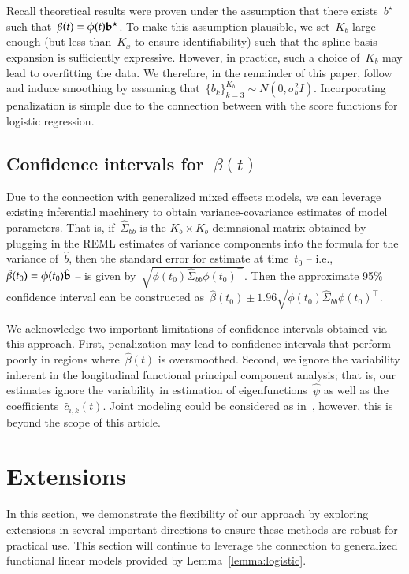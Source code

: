 \documentclass[12pt]{amsart}
\begin{document}
Recall theoretical results were proven under the assumption that there
exists~$b^\star$ such that~$\beta(t) = \phi(t) {\bf b}^\star$.
To make this assumption plausible, we set~$K_b$ large enough (but less
than~$K_x$ to ensure identifiability) such that the spline basis
expansion is sufficiently expressive. However, in practice, such a
choice of~$K_b$ may lead to overfitting the data. We therefore, in the
remainder of this paper, follow~\cite{GoldSmith2015} and induce
smoothing by assuming that~$\{ b_k \}_{k=3}^{K_b} \sim N(0, \sigma_b^2
I)$. Incorporating penalization is simple due to the connection
between with the score functions for logistic regression. 

\subsection{Confidence intervals for~$\beta(t)$}

Due to the connection with generalized mixed effects models, we can
leverage existing inferential machinery to obtain variance-covariance
estimates of model parameters. 
That is, if~$\hat \Sigma_{bb}$ is the $K_b \times K_b$ deimnsional
matrix obtained by plugging in the REML estimates of variance
components into the formula for the variance of~$\hat b$, then the
standard error for estimate at time~$t_0$ -- i.e., ~$\hat \beta (t_0)
= \phi(t_0) \hat {\bf b}$ -- is given by~$\sqrt{ \phi (t_0 )
  \hat \Sigma_{bb} \phi(t_0)^\top}$.  Then the approximate 95\%
confidence interval can be constructed as~$\hat \beta (t_0) \pm 1.96
\sqrt{\phi (t_0) \hat \Sigma_{bb} \phi(t_0)^\top}$. 
 
We acknowledge two important limitations of confidence intervals
obtained via this approach. First, penalization may lead to confidence
intervals that perform poorly in regions where~$\hat \beta(t)$ is
oversmoothed. Second, we ignore the variability inherent in the
longitudinal functional principal component analysis; that is, our
estimates ignore the variability in estimation of eigenfunctions~$\hat
\psi$ as well as the coefficients~$\hat c_{i,k}(t)$.
Joint modeling could be considered as in~\cite{Crainiceanu2010},
however, this is beyond the scope of this article.

\section{Extensions}

In this section, we demonstrate the flexibility of our approach by
exploring extensions in several important directions to ensure these
methods are robust for practical use.
This section will continue to leverage the connection to generalized
functional linear models provided by Lemma~\ref{lemma:logistic}.
\end{document}
